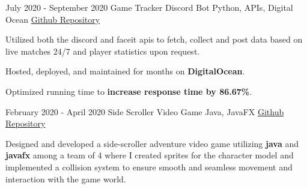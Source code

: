 \documentclass[]{awesome-cv}
\begin{document}
\begin{cventries}
	  \cventry
    {July 2020 - September 2020} 
    {Game Tracker Discord Bot}
    {Python, APIs, Digital Ocean} 
    {\href{https://github.com/krang-8/Game-Tracker}{Github Repository}} 
    {
      \begin{cvitems} %
        \item {Utilized both the discord and faceit apis to fetch, collect and post data based on live matches 24/7 and player statistics upon request.}
        \item {Hosted, deployed, and maintained for months on \textbf{DigitalOcean}.}
        \item {Optimized running time to \textbf{increase response time by 86.67\%}.}
      \end{cvitems}
    }


	
	
\cventry
	{February 2020 - April 2020}
	{Side Scroller Video Game}
	{Java, JavaFX}
	{\href{https://github.com/krang-8/Game-Project}{Github Repository}}
    {
      \begin{cvitems} %
        \item {Designed and developed a side-scroller adventure video game utilizing \textbf{java} and \textbf{javafx} among a team of 4 where I created sprites for the character model and implemented a collision system to ensure smooth and seamless movement and interaction with the game world. }
      \end{cvitems}
    }

\end{cventries}


\vspace{-4mm}
\end{document}
